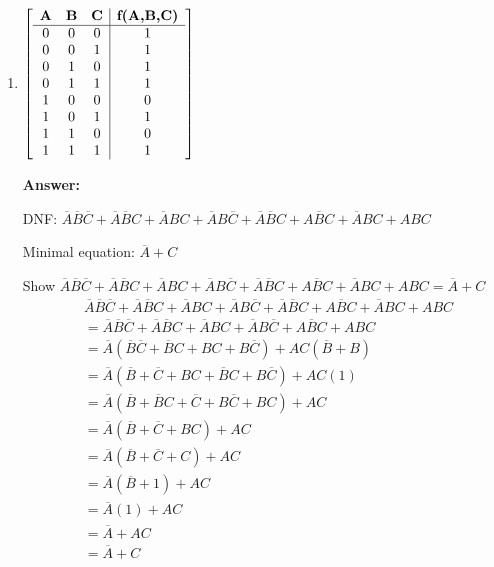 \documentclass[12pt]{article}
\begin{document}
\begin{enumerate}
\begin{enumerate}
      \item
      \noindent
      $\displaystyle
      \left[
        \begin{array}{c c c|c}
          \textbf{A} & \textbf{B} & \textbf{C} & \textbf{f(A,B,C)} \\
          \hline
          0 & 0 & 0 & 1 \\
          0 & 0 & 1 & 1 \\
          0 & 1 & 0 & 1 \\
          0 & 1 & 1 & 1 \\
          1 & 0 & 0 & 0 \\
          1 & 0 & 1 & 1 \\
          1 & 1 & 0 & 0 \\
          1 & 1 & 1 & 1
        \end{array}
      \right]$

      \vspace{2em}
      \textbf{Answer:}
      \begin{Karnaughvuit}
      \end{Karnaughvuit}

      DNF: $\overline{A}\overline{B}\overline{C} + \overline{A}\overline{B}C + \overline{A}BC + \overline{A}B\overline{C} + \overline{A}\overline{B}C + A\overline{B}C + \overline{A}BC + ABC$

      Minimal equation: $\overline{A} + C$

      Show $\overline{A}\overline{B}\overline{C} + \overline{A}\overline{B}C + \overline{A}BC + \overline{A}B\overline{C} + \overline{A}\overline{B}C + A\overline{B}C + \overline{A}BC + ABC = \overline{A} + C$
      \begin{align*}
        &\overline{A}\overline{B}\overline{C} + \overline{A}\overline{B}C + \overline{A}BC + \overline{A}B\overline{C} + \overline{A}\overline{B}C + A\overline{B}C + \overline{A}BC + ABC\\
        &= \overline{A}\overline{B}\overline{C} + \overline{A}\overline{B}C + \overline{A}BC + \overline{A}B\overline{C} + A\overline{B}C + ABC \\
        &= \overline{A}(\overline{B}\overline{C} + \overline{B}C + BC + B\overline{C}) + AC(\overline{B} + B) \\
        &= \overline{A}(\overline{B} + \overline{C} + BC + \overline{B}C + B\overline{C}) + AC(1) \\
        &= \overline{A}(\overline{B} + \overline{B}C + \overline{C} + B\overline{C} + BC) + AC \\
        &= \overline{A}(\overline{B} + \overline{C} + BC) + AC \\
        &= \overline{A}(\overline{B} + \overline{C} + C) + AC \\
        &= \overline{A}(\overline{B} + 1) + AC \\
        &= \overline{A}(1) + AC \\
        &= \overline{A} + AC \\
        &= \overline{A} + C
      \end{align*}


\end{enumerate}
\end{enumerate}
\end{document}
